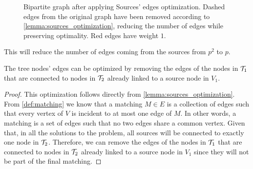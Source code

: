 \begin{example}
\begin{figure}[H]
        \caption{Bipartite graph after applying Sources' edges optimization. Dashed edges from the original graph have been removed according to \cref{lemma:sources_optimization}, reducing the number of edges while preserving optimality. Red edges have weight $1$.}
        \label{fig:source_optimization}
    \end{figure}
\end{example}

This will reduce the number of edges coming from the sources from $p^2$ to $p$.

\begin{lemma} \label{lemma:tree_optimization_1}
    The tree nodes' edges can be optimized by removing the edges of the nodes in $\mathcal{T}_{1}$ that are connected to nodes in $\mathcal{T}_{2}$ already linked to a source node in $V_1$.
\end{lemma}

\begin{proof}
    This optimization follows directly from \cref{lemma:sources_optimization}.
    From \cref{def:matching} we know that a matching $M \in E$ is a collection of edges such that every vertex of $V$ is incident to at most one edge of $M$. In other words, a matching is a set of edges such that no two edges share a common vertex. Given that, in all the solutions to the problem, all sources will be connected to exactly one node in $\mathcal{T}_{2}$. Therefore, we can remove the edges of the nodes in $\mathcal{T}_{1}$ that are connected to nodes in $\mathcal{T}_{2}$ already linked to a source node in $V_1$ since they will not be part of the final matching.
\end{proof}

